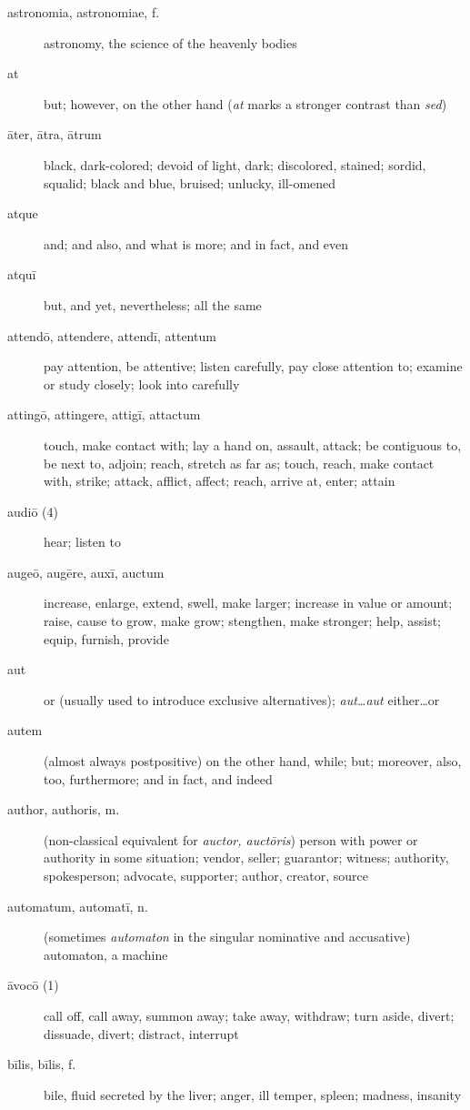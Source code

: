 \begin{description}
    \item[astronomia, astronomiae, f.] astronomy, the science of the heavenly bodies
    \item[at] but; however, on the other hand (\textit{at} marks a stronger contrast than \textit{sed})
    \item[āter, ātra, ātrum] black, dark-colored; devoid of light, dark; discolored, stained; sordid, squalid; black and blue, bruised; unlucky, ill-omened
    \item[atque] and; and also, and what is more; and in fact, and even
    \item[atquī] but, and yet, nevertheless; all the same
    \item[attendō, attendere, attendī, attentum] pay attention, be attentive; listen carefully, pay close attention to; examine or study closely; look into carefully
    \item[attingō, attingere, attigī, attactum] touch, make contact with; lay a hand on, assault, attack; be contiguous to, be next to, adjoin; reach, stretch as far as; touch, reach, make contact with, strike; attack, afflict, affect; reach, arrive at, enter; attain
    \item[audiō (4)] hear; listen to
    \item[augeō, augēre, auxī, auctum] increase, enlarge, extend, swell, make larger; increase in value or amount; raise, cause to grow, make grow; stengthen, make stronger; help, assist; equip, furnish, provide
    \item[aut] or (usually used to introduce exclusive alternatives); \textit{aut\dots aut} either\dots or
    \item[autem] (almost always postpositive) on the other hand, while; but; moreover, also, too, furthermore; and in fact, and indeed
    \item[author, authoris, m.] (non-classical equivalent for \textit{auctor, auctōris}) person with power or authority in some situation; vendor, seller; guarantor; witness; authority, spokesperson; advocate, supporter; author, creator, source
    \item[automatum, automatī, n.] (sometimes \textit{automaton} in the singular nominative and accusative) automaton, a machine
    \item[āvocō (1)] call off, call away, summon away; take away, withdraw; turn aside, divert; dissuade, divert; distract, interrupt
    \item[bīlis, bīlis, f.]  bile, fluid secreted by the liver; anger, ill temper, spleen; madness, insanity

\end{description}
